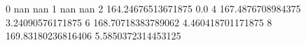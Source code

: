 0 nan nan
1 nan nan
2 164.24676513671875 0.0
4 167.4876708984375 3.24090576171875
6 168.70718383789062 4.460418701171875
8 169.83180236816406 5.5850372314453125
